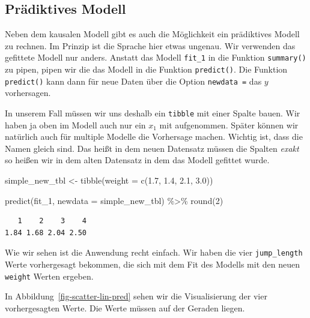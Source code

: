 \documentclass[
  letterpaper,
]{scrbook}
\newenvironment{Shaded}{\begin{snugshade}}{\end{snugshade}}
\newcommand{\AttributeTok}[1]{\textcolor[rgb]{0.40,0.45,0.13}{#1}}
\newcommand{\DecValTok}[1]{\textcolor[rgb]{0.68,0.00,0.00}{#1}}
\newcommand{\FloatTok}[1]{\textcolor[rgb]{0.68,0.00,0.00}{#1}}
\newcommand{\FunctionTok}[1]{\textcolor[rgb]{0.28,0.35,0.67}{#1}}
\newcommand{\NormalTok}[1]{\textcolor[rgb]{0.00,0.23,0.31}{#1}}
\newcommand{\OtherTok}[1]{\textcolor[rgb]{0.00,0.23,0.31}{#1}}
\newcommand{\SpecialCharTok}[1]{\textcolor[rgb]{0.37,0.37,0.37}{#1}}
\begin{document}
\hypertarget{sec-simple-pred}{%
\subsection{Prädiktives Modell}\label{sec-simple-pred}}

Neben dem kausalen Modell gibt es auch die Möglichkeit ein prädiktives
Modell zu rechnen. Im Prinzip ist die Sprache hier etwas ungenau. Wir
verwenden das gefittete Modell nur anders. Anstatt das Modell
\texttt{fit\_1} in die Funktion \texttt{summary()} zu pipen, pipen wir
die das Modell in die Funktion \texttt{predict()}. Die Funktion
\texttt{predict()} kann dann für neue Daten über die Option
\texttt{newdata\ =} das \(y\) vorhersagen.

In unserem Fall müssen wir uns deshalb ein \texttt{tibble} mit einer
Spalte bauen. Wir haben ja oben im Modell auch nur ein \(x_1\) mit
aufgenommen. Später können wir natürlich auch für multiple Modelle die
Vorhersage machen. Wichtig ist, dass die Namen gleich sind. Das heißt in
dem neuen Datensatz müssen die Spalten \emph{exakt} so heißen wir in dem
alten Datensatz in dem das Modell gefittet wurde.

\begin{Shaded}
\begin{Highlighting}[]
\NormalTok{simple\_new\_tbl }\OtherTok{\textless{}{-}} \FunctionTok{tibble}\NormalTok{(}\AttributeTok{weight =} \FunctionTok{c}\NormalTok{(}\FloatTok{1.7}\NormalTok{, }\FloatTok{1.4}\NormalTok{, }\FloatTok{2.1}\NormalTok{, }\FloatTok{3.0}\NormalTok{)) }

\FunctionTok{predict}\NormalTok{(fit\_1, }\AttributeTok{newdata =}\NormalTok{ simple\_new\_tbl) }\SpecialCharTok{\%\textgreater{}\%} \FunctionTok{round}\NormalTok{(}\DecValTok{2}\NormalTok{)}
\end{Highlighting}
\end{Shaded}

\begin{verbatim}
   1    2    3    4 
1.84 1.68 2.04 2.50 
\end{verbatim}

Wie wir sehen ist die Anwendung recht einfach. Wir haben die vier
\texttt{jump\_length} Werte vorhergesagt bekommen, die sich mit dem Fit
des Modells mit den neuen \texttt{weight} Werten ergeben.

In Abbildung~\ref{fig-scatter-lin-pred} sehen wir die Visualisierung der
vier vorhergesagten Werte. Die Werte müssen auf der Geraden liegen.
\end{document}
